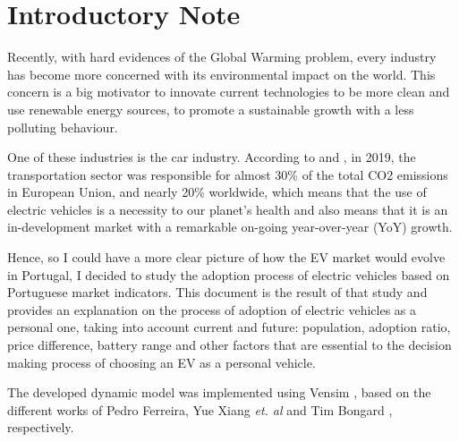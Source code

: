 \section{Introductory Note} \label{section:intro}
Recently, with hard evidences of the Global Warming problem, every industry has become more concerned with its environmental impact on the world. This concern is a big motivator to innovate current technologies to be more clean and use renewable energy sources, to promote a sustainable growth with a less polluting behaviour.

One of these industries is the car industry. According to \cite{Weiss00onthe} and \cite{eu-parliament}, in 2019, the transportation sector was responsible for almost 30\% of the total CO2 emissions in European Union, and nearly 20\% worldwide, which means that the use of electric vehicles is a necessity to our planet's health and also means that it is an in-development market with a remarkable on-going year-over-year (YoY) growth.

Hence, so I could have a more clear picture of how the EV market would evolve in Portugal, I decided to study the adoption process of electric vehicles based on Portuguese market indicators. This document is the result of that study and provides an explanation on the process of adoption of electric vehicles as a personal one, taking into account current and future: population, adoption ratio, price difference, battery range and other factors that are essential to the decision making process of choosing an EV as a personal vehicle.

The developed dynamic model was implemented using Vensim \cite{vensim, mod-helper, vensim-youtube}, based on the different works of Pedro Ferreira, Yue Xiang \textit{et. al} and Tim Bongard \cite{thesis-base, pedro-report, yue-xiang-paper}, respectively.

\clearpage
